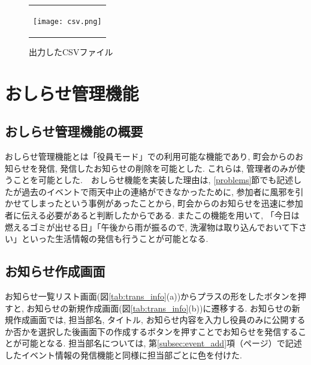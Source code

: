 \begin{figure}[htbp]
  \begin{center}
    \begin{tabular}{c}

      \begin{minipage}{1\hsize}
        \begin{center}
\texttt{[image: csv.png]}
          \hspace{1cm} %
        \end{center}
      \end{minipage}

    \end{tabular}
    \caption{出力したCSVファイル}
    \label{tab:csv}
  \end{center}
\end{figure}

\section{おしらせ管理機能}%
\subsection{おしらせ管理機能の概要}%
おしらせ管理機能とは「役員モード」での利用可能な機能であり, 町会からのお知らせを発信, 発信したお知らせの削除を可能とした. これらは, 管理者のみが使うことを可能とした.　おしらせ機能を実装した理由は, \ref{problems}節でも記述したが過去のイベントで雨天中止の連絡ができなかったために, 参加者に風邪を引かせてしまったという事例があったことから, 町会からのお知らせを迅速に参加者に伝える必要があると判断したからである. またこの機能を用いて, 「今日は燃えるゴミが出せる日」「午後から雨が振るので, 洗濯物は取り込んでおいて下さい」といった生活情報の発信も行うことが可能となる.


\subsection{お知らせ作成画面}%
お知らせ一覧リスト画面(図\ref{tab:trans_info}(a))からプラスの形をしたボタンを押すと, お知らせの新規作成画面(図\ref{tab:trans_info}(b))に遷移する. お知らせの新規作成画面では, 担当部名, タイトル, お知らせ内容を入力し役員のみに公開するか否かを選択した後画面下の作成するボタンを押すことでお知らせを発信することが可能となる. 担当部名については, 第\ref{subsec:event_add}項（\pageref{subsec:event_add}ページ）で記述したイベント情報の発信機能と同様に担当部ごとに色を付けた.


